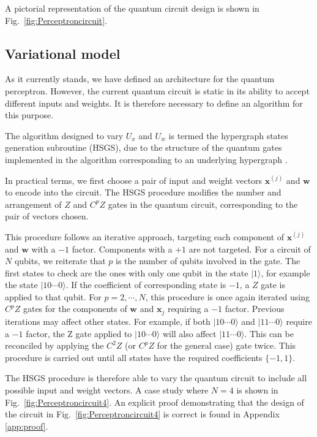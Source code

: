 \documentclass[twocolumn,superscriptaddress]{revtex4-1}
\begin{document}
A pictorial representation of the quantum circuit design is shown in Fig.~\ref{fig:Perceptroncircuit}.

\subsection{Variational model} \label{varmodel}

As it currently stands, we have defined an architecture for the quantum perceptron. However, the current quantum circuit is static in its ability to accept different inputs and weights. It is therefore necessary to define an algorithm for this purpose.

The algorithm designed to vary $U_x$ and $U_w$ is termed the hypergraph states generation subroutine (HSGS), due to the structure of the quantum gates implemented in the algorithm corresponding to an underlying hypergraph \cite{Rossi_2013}. 

In practical terms, we first choose a pair of input and weight vectors $\bm{x}^{(j)}$ and $\bm{w}$ to encode into the circuit. The HSGS procedure modifies the number and arrangement of $Z$ and $C^pZ$ gates in the quantum circuit, corresponding to the pair of vectors chosen. 

This procedure follows an iterative approach, targeting each component of $\bm{x}^{(j)}$ and $\bm{w}$ with a $-1$ factor. Components with a $+1$ are not targeted. For a circuit of $N$ qubits, we reiterate that $p$ is the number of qubits involved in the gate. The first states to check are the ones with only one qubit in the state $|1 \rangle$, for example the state $|10 \cdots 0 \rangle$. If the coefficient of corresponding state is $-1$, a $Z$ gate is applied to that qubit. For $p = 2, \cdots, N$, this procedure is once again iterated using $C^pZ$ gates for the components of $\bm{w}$ and $\bm{x}_j$ requiring a $-1$ factor. Previous iterations may affect other states. For example, if both $|10 \cdots 0 \rangle$ and $|11 \cdots 0 \rangle$ require a $-1$ factor, the Z gate applied to $|10 \cdots 0 \rangle$ will also affect $|11 \cdots 0 \rangle$. This can be reconciled by applying the $C^2Z$ (or $C^pZ$ for the general case) gate twice. This procedure is carried out until all states have the required coefficients $\{-1, 1\}$.

The HSGS procedure is therefore able to vary the quantum circuit to include all possible input and weight vectors. A case study where $N=4$ is shown in Fig.~\ref{fig:Perceptroncircuit4}. An explicit proof demonstrating that the design of the circuit in Fig.~\ref{fig:Perceptroncircuit4} is correct is found in Appendix \ref{app:proof}.
\end{document}

